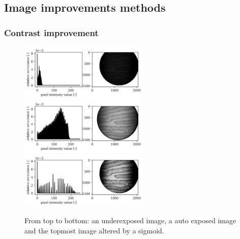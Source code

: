 \newpage

\subsection{Image improvements methods}


\subsubsection{Contrast improvement}



\begin{figure}
  \centering
  \includegraphics[width=0.55\textwidth,keepaspectratio]{afbeeldingen/Histogram_results/donkerhistogram.png}
  \includegraphics[width=0.55\textwidth,keepaspectratio]{afbeeldingen/Histogram_results/lichthistogram.png}
  \includegraphics[width=0.55\textwidth,keepaspectratio]{afbeeldingen/Histogram_results/improved_contrast_histogram.png}
  \caption{From top to bottom: an underexposed image, a auto exposed image and the topmost image altered by a sigmoid.}
  \label{fig:contrast_improvement}
\end{figure}

